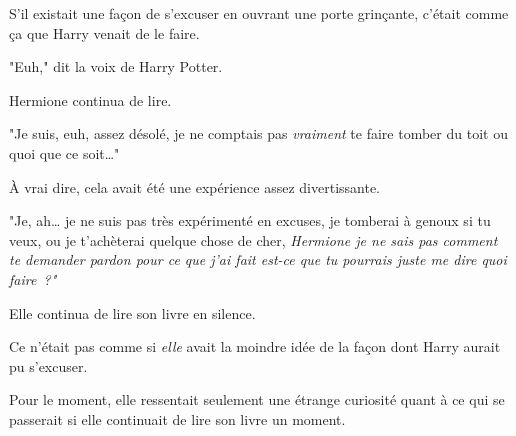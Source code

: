 S'il existait une façon de s'excuser en ouvrant une porte grinçante, c'était comme ça que Harry venait de le faire.

"Euh," dit la voix de Harry Potter.

Hermione continua de lire.

"Je suis, euh, assez désolé, je ne comptais pas \emph{vraiment} te faire tomber du toit ou quoi que ce soit…"

À vrai dire, cela avait été une expérience assez divertissante.

"Je, ah… je ne suis pas très expérimenté en excuses, je tomberai à genoux si tu veux, ou je t'achèterai quelque chose de cher, \emph{Hermione je ne sais pas comment te demander pardon pour ce que j'ai fait est-ce que tu pourrais juste me dire quoi faire~?"}

Elle continua de lire son livre en silence.

Ce n'était pas comme si \emph{elle} avait la moindre idée de la façon dont Harry aurait pu s'excuser.

Pour le moment, elle ressentait seulement une étrange curiosité quant à ce qui se passerait si elle continuait de lire son livre un moment. 

